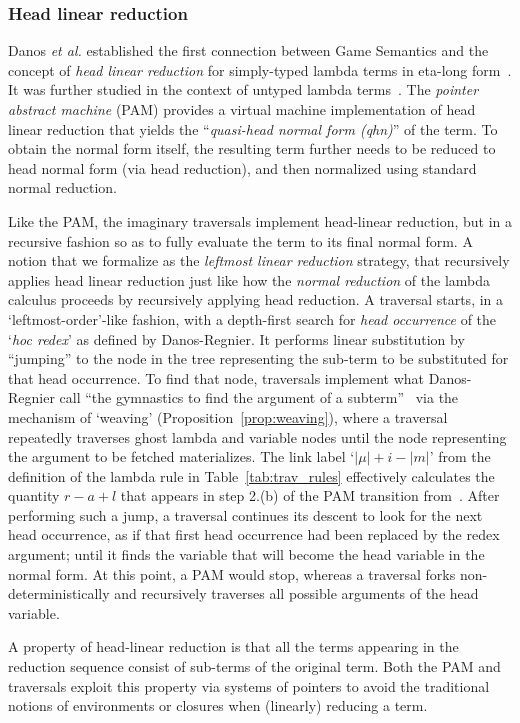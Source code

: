 \documentclass{elsarticle}
\makeatletter
\theoremstyle{plain}
\theoremstyle{definition}
\def\etal{\textit{et al.}\@\xspace}
\makeatother
\begin{document}
\subsubsection{Head linear reduction}
Danos \etal established the first connection between Game Semantics and the concept of \emph{head linear reduction} for simply-typed lambda terms in eta-long form~\cite{danosherbelinregnier1996}. It was further studied in the context of untyped lambda terms~\cite{danos-head}. The \emph{pointer abstract machine} (PAM) provides a virtual machine implementation of head linear reduction that yields the ``\emph{quasi-head normal form (qhn)}'' of the term. To obtain the normal form itself, the resulting term further needs to be reduced to head normal form (via head reduction), and then normalized using standard normal reduction.

Like the PAM, the imaginary traversals implement head-linear reduction, but in a recursive fashion so as to fully evaluate the term to its final normal form.
A notion that we formalize as the \emph{leftmost linear reduction} strategy, that recursively applies head linear reduction just like how the \emph{normal reduction} of the lambda calculus proceeds by recursively applying head reduction.
A traversal starts, in a `leftmost-order'-like fashion, with a depth-first search for \emph{head occurrence} of the `\emph{hoc redex}' as defined by Danos-Regnier. It performs linear substitution by ``jumping'' to the node in the tree representing the sub-term to be substituted for that head occurrence.
To find that node, traversals implement what Danos-Regnier call ``the gymnastics to find the argument of a subterm''~\cite{danos-head} via the mechanism of `weaving' (Proposition~\ref{prop:weaving}),
where a traversal repeatedly traverses ghost lambda and variable nodes until the node representing the argument to be fetched materializes.
The link label `$|\mu|+i-|m|$' from the definition
of the lambda rule in Table~\ref{tab:trav_rules} effectively calculates the quantity $r-a+l$ that appears in step 2.(b) of the PAM transition from~\cite{danos-head}.
After performing such a jump, a traversal continues its descent to look for the next head occurrence, as if that first head occurrence had been replaced by the redex argument; until it finds the variable that will become the head variable in the normal form. At this point, a PAM would stop, whereas a traversal forks  non-deterministically and recursively traverses all possible arguments of the head variable.

A property of head-linear reduction is that all the terms appearing in the reduction sequence consist of sub-terms of the original term.
Both the PAM and traversals exploit this property via systems of pointers to avoid the traditional notions of environments or closures when (linearly) reducing a term.
\end{document}
